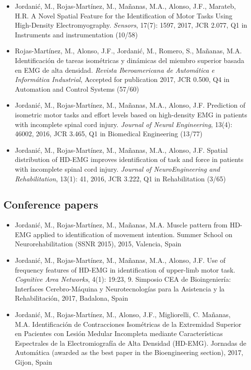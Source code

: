 \begin{itemize}
\item Jordanić, M., Rojas-Martínez, M., Mañanas, M.A., Alonso, J.F., Marateb, H.R. A Novel Spatial Feature for the Identification of Motor Tasks Using High-Density Electromyography. \textit{Sensors}, 17(7): 1597, 2017, JCR 2.077, Q1 in Instruments and instrumentation (10/58)

\item Rojas-Martínez, M., Alonso, J.F., Jordanić, M., Romero, S., Mañanas, M.A. Identificación de tareas isométricas y dinámicas del miembro superior basada en EMG de alta densidad. \textit{Revista Iberoamericana de Automática e Informática Industrial}, Accepted for publication 2017, JCR 0.500, Q4 in Automation and Control Systems (57/60)

\item Jordanić, M., Rojas-Martínez, M., Mañanas, M.A., Alonso, J.F. Prediction of isometric motor tasks and effort levels based on high-density EMG in patients with incomplete spinal cord injury. \textit{Journal of Neural Engineering}, 13(4): 46002, 2016, JCR 3.465, Q1 in Biomedical Engineering (13/77)

\item Jordanić, M., Rojas-Martínez, M., Mañanas, M.A., Alonso, J.F. Spatial distribution of HD-EMG improves identification of task and force in patients with incomplete spinal cord injury. \textit{Journal of NeuroEngineering and Rehabilitation}, 13(1): 41, 2016, JCR 3.222, Q1 in Rehabilitation (3/65)
\end{itemize}


\subsection{Conference papers}

\begin{itemize}
\item Jordanić, M., Rojas-Martínez, M., Mañanas, M.A. Muscle pattern from HD-EMG applied to identification of movement intention. Summer School on Neurorehabilitation (SSNR 2015), 2015, Valencia, Spain

\item   Jordanić, M., Rojas-Martínez, M., Mañanas, M.A., Alonso, J.F. Use of frequency features of HD-EMG in identification of upper-limb motor task. \textit{Cognitive Area Networks}, 4(1): 19:23, 9. Simposio CEA de Bioingeniería: Interfaces Cerebro-Máquina y Neurotecnologías para la Asistencia y la Rehabilitación, 2017, Badalona, Spain

\item Jordanić, M., Rojas-Martínez, M., Alonso, J.F., Migliorelli, C. Mañanas, M.A. Identificación de Contracciones Isométricas de la Extremidad Superior en Pacientes con Lesión Medular Incompleta mediante Características Espectrales de la Electromiografía de Alta Densidad (HD-EMG). Jornadas de Automática (awarded as the best paper in the Bioengineering section), 2017, Gijon, Spain

	
\end{itemize}


